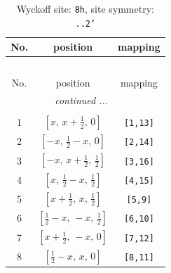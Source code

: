 \documentclass[fleqn,8pt]{jsarticle}
\begin{document}
\begin{longtable}{ccc}
\caption{Wyckoff site: {\tt 8h}, site symmetry: {\tt ..2'}}
 \\
 \hline \hline
No. & position & mapping \\ \hline \endfirsthead

\multicolumn{2}{l}{\tablename\ \thetable{}} \\
 \hline \hline
No. & position & mapping \\ \hline \endhead

 \hline \hline
\multicolumn{2}{r}{\footnotesize\it continued ...} \\ \endfoot

 \hline \hline
\multicolumn{2}{r}{} \\ \endlastfoot

1 & $\left[ x,\, x + \frac{1}{2},\, 0 \right]$ & {\tt [1,13]} \\ \hline
2 & $\left[ - x,\, \frac{1}{2} - x,\, 0 \right]$ & {\tt [2,14]} \\ \hline
3 & $\left[ - x,\, x + \frac{1}{2},\, \frac{1}{2} \right]$ & {\tt [3,16]} \\ \hline
4 & $\left[ x,\, \frac{1}{2} - x,\, \frac{1}{2} \right]$ & {\tt [4,15]} \\ \hline
5 & $\left[ x + \frac{1}{2},\, x,\, \frac{1}{2} \right]$ & {\tt [5,9]} \\ \hline
6 & $\left[ \frac{1}{2} - x,\, - x,\, \frac{1}{2} \right]$ & {\tt [6,10]} \\ \hline
7 & $\left[ x + \frac{1}{2},\, - x,\, 0 \right]$ & {\tt [7,12]} \\ \hline
8 & $\left[ \frac{1}{2} - x,\, x,\, 0 \right]$ & {\tt [8,11]} \\
\end{longtable}
\renewcommand{\arraystretch}{1.2}
\end{document}
